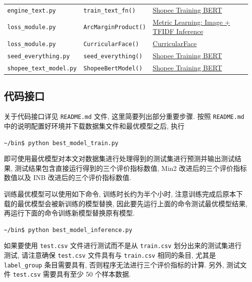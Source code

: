 \documentclass[12pt]{article}
\begin{document}
\begin{table}[htbp]
\begin{tabular}{lll}
    \verb|engine_text.py| & \verb|train_text_fn()| & \href{https://www.kaggle.com/shigemitsutomizawa/shopee-training-bert-11th-place-simple-solution}{Shopee Training BERT} \\
    \verb|loss_module.py| & \verb|ArcMarginProduct()| & \href{https://www.kaggle.com/tanulsingh077/metric-learning-image-tfidf-inference}{Metric Learning: Image + TFIDF Inference} \\
    \verb|loss_module.py| & \verb|CurricularFace()| & \href{https://github.com/HuangYG123/CurricularFace/blob/8b2f47318117995aa05490c05b455b113489917e/head/metrics.py#L70}{CurricularFace} \\
    \verb|seed_everything.py| & \verb|seed_everything()| & \href{https://www.kaggle.com/shigemitsutomizawa/shopee-training-bert-11th-place-simple-solution}{Shopee Training BERT} \\
    \verb|shopee_text_model.py| & \verb|ShopeeBertModel()| & \href{https://www.kaggle.com/shigemitsutomizawa/shopee-training-bert-11th-place-simple-solution}{Shopee Training BERT} \\
    \bottomrule
  \end{tabular}
\end{table}

\subsection{代码接口}

关于代码接口详见 \verb|README.md| 文件, 这里简要列出部分重要步骤. 按照 \verb|README.md| 中的说明配置好环境并下载数据集文件和最优模型之后, 执行

\verb|~/bin$ python best_model_train.py|

即可使用最优模型对本文对数据集进行处理得到的测试集进行预测并输出测试结果, 测试结果包含直接运行得到的三个评价指标数值, Min2 改进后的三个评价指标数值以及 INB 改进后的三个评价指标数值.

训练最优模型可以使用如下命令, 训练时长约为半个小时, 注意训练完成后原本下载的最优模型会被新训练的模型替换, 因此要先运行上面的命令测试最优模型结果, 再运行下面的命令训练新模型替换原有模型.

\verb|~/bin$ python best_model_inference.py|

如果要使用 \verb|test.csv| 文件进行测试而不是从 \verb|train.csv| 划分出来的测试集进行测试, 请注意确保 \verb|test.csv| 文件具有与 \verb|train.csv| 相同的条目, 尤其是 \verb|label_group| 条目需要具有, 否则程序无法进行三个评价指标的计算. 另外, 测试文件 \verb|test.csv| 需要具有至少 50 个样本数据.
\end{document}
